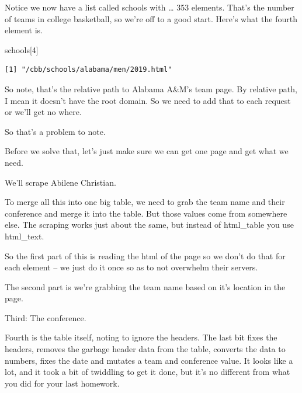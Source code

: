 \documentclass[
  letterpaper,
  DIV=11,
  numbers=noendperiod]{scrreprt}
\newenvironment{Shaded}{\begin{snugshade}}{\end{snugshade}}
\newcommand{\DecValTok}[1]{\textcolor[rgb]{0.68,0.00,0.00}{#1}}
\newcommand{\NormalTok}[1]{\textcolor[rgb]{0.00,0.23,0.31}{#1}}
\begin{document}
Notice we now have a list called schools with \ldots{} 353 elements.
That's the number of teams in college basketball, so we're off to a good
start. Here's what the fourth element is.

\begin{Shaded}
\begin{Highlighting}[]
\NormalTok{schools[}\DecValTok{4}\NormalTok{]}
\end{Highlighting}
\end{Shaded}

\begin{verbatim}
[1] "/cbb/schools/alabama/men/2019.html"
\end{verbatim}

So note, that's the relative path to Alabama A\&M's team page. By
relative path, I mean it doesn't have the root domain. So we need to add
that to each request or we'll get no where.

So that's a problem to note.

Before we solve that, let's just make sure we can get one page and get
what we need.

We'll scrape Abilene Christian.

To merge all this into one big table, we need to grab the team name and
their conference and merge it into the table. But those values come from
somewhere else. The scraping works just about the same, but instead of
html\_table you use html\_text.

So the first part of this is reading the html of the page so we don't do
that for each element -- we just do it once so as to not overwhelm their
servers.

The second part is we're grabbing the team name based on it's location
in the page.

Third: The conference.

Fourth is the table itself, noting to ignore the headers. The last bit
fixes the headers, removes the garbage header data from the table,
converts the data to numbers, fixes the date and mutates a team and
conference value. It looks like a lot, and it took a bit of twiddling to
get it done, but it's no different from what you did for your last
homework.
\end{document}
